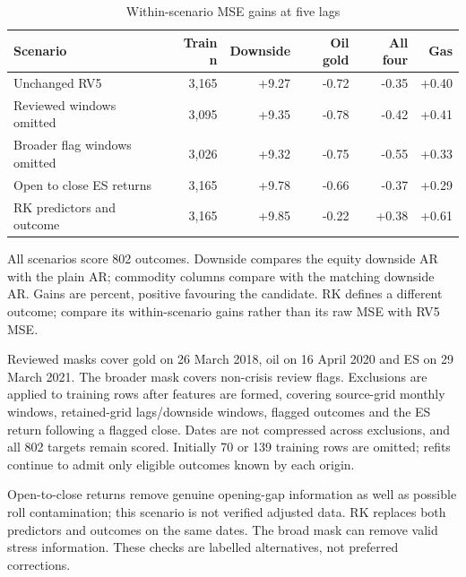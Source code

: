\documentclass[11pt,letterpaper]{article}
\begin{document}
\begin{table}[H]
\centering
\caption{Within-scenario MSE gains at five lags}\label{tab:scenarios}
\footnotesize
\begin{tabular}{p{2.3in}rrrrr}
\toprule
Scenario & Train n & Downside & Oil gold & All four & Gas \\
\midrule
Unchanged RV5 & 3,165 & +9.27 & -0.72 & -0.35 & +0.40 \\
Reviewed windows omitted & 3,095 & +9.35 & -0.78 & -0.42 & +0.41 \\
Broader flag windows omitted & 3,026 & +9.32 & -0.75 & -0.55 & +0.33 \\
Open to close ES returns & 3,165 & +9.78 & -0.66 & -0.37 & +0.29 \\
RK predictors and outcome & 3,165 & +9.85 & -0.22 & +0.38 & +0.61 \\
\bottomrule
\end{tabular}
\end{table}
{\footnotesize All scenarios score 802 outcomes. Downside compares the equity downside AR with the plain AR; commodity columns compare with the matching downside AR. Gains are percent, positive favouring the candidate. RK defines a different outcome; compare its within-scenario gains rather than its raw MSE with RV5 MSE.\par}


Reviewed masks cover gold on 26 March 2018, oil on 16 April 2020 and ES on
29 March 2021. The broader mask covers non-crisis review flags. Exclusions are
applied to training rows after features are formed, covering source-grid monthly
windows, retained-grid lags/downside windows, flagged outcomes and the ES return
following a flagged close. Dates are not compressed across exclusions, and all
802 targets remain scored. Initially 70 or 139 training rows are omitted; refits
continue to admit only eligible outcomes known by each origin.

Open-to-close returns remove genuine opening-gap information as well as possible
roll contamination; this scenario is not verified adjusted data. RK replaces both
predictors and outcomes on the same dates. The broad mask can remove valid stress
information. These checks are labelled alternatives, not preferred corrections.
\end{document}

